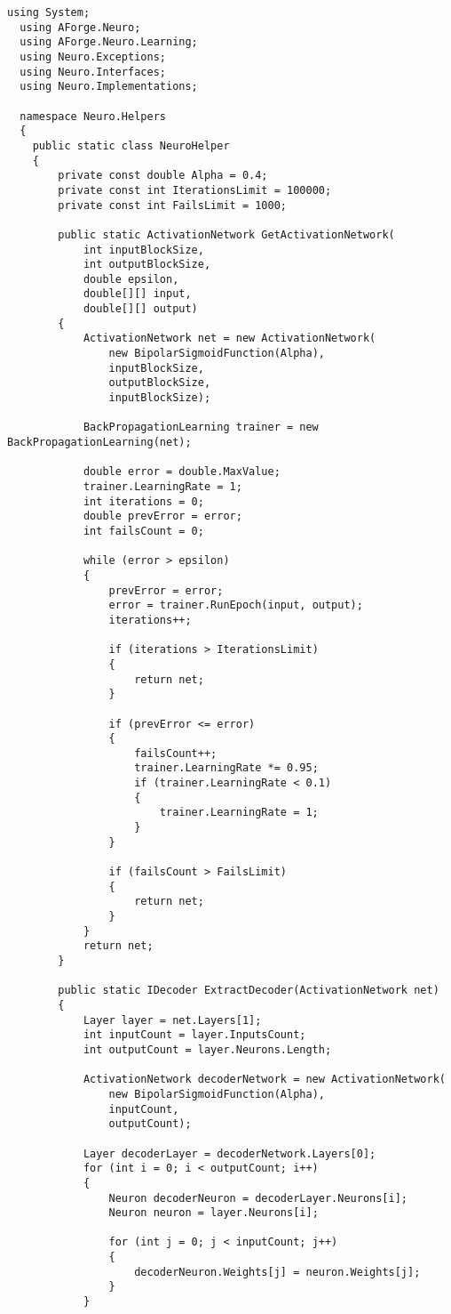 \begin{lstlisting}[style=csharpinlinestyle,caption={Обучение нейронной сети}, label=lst:appendix:neuro_learning]
  using System;
  using AForge.Neuro;
  using AForge.Neuro.Learning;
  using Neuro.Exceptions;
  using Neuro.Interfaces;
  using Neuro.Implementations;

  namespace Neuro.Helpers
  {
  	public static class NeuroHelper
  	{
  		private const double Alpha = 0.4;
  		private const int IterationsLimit = 100000;
  		private const int FailsLimit = 1000;

  		public static ActivationNetwork GetActivationNetwork(
  			int inputBlockSize,
  			int outputBlockSize,
  			double epsilon,
  			double[][] input,
  			double[][] output)
  		{
  			ActivationNetwork net = new ActivationNetwork(
  				new BipolarSigmoidFunction(Alpha),
  				inputBlockSize,
  				outputBlockSize,
  				inputBlockSize);

  			BackPropagationLearning trainer = new BackPropagationLearning(net);

  			double error = double.MaxValue;
  			trainer.LearningRate = 1;
  			int iterations = 0;
  			double prevError = error;
  			int failsCount = 0;

  			while (error > epsilon)
  			{
  				prevError = error;
  				error = trainer.RunEpoch(input, output);
  				iterations++;

  				if (iterations > IterationsLimit)
  				{
  					return net;
  				}

  				if (prevError <= error)
  				{
  					failsCount++;
  					trainer.LearningRate *= 0.95;
  					if (trainer.LearningRate < 0.1)
  					{
  						trainer.LearningRate = 1;
  					}
  				}

  				if (failsCount > FailsLimit)
  				{
  					return net;
  				}
  			}
  			return net;
  		}

  		public static IDecoder ExtractDecoder(ActivationNetwork net)
  		{
  			Layer layer = net.Layers[1];
  			int inputCount = layer.InputsCount;
  			int outputCount = layer.Neurons.Length;

  			ActivationNetwork decoderNetwork = new ActivationNetwork(
  				new BipolarSigmoidFunction(Alpha),
  				inputCount,
  				outputCount);

  			Layer decoderLayer = decoderNetwork.Layers[0];
  			for (int i = 0; i < outputCount; i++)
  			{
  				Neuron decoderNeuron = decoderLayer.Neurons[i];
  				Neuron neuron = layer.Neurons[i];

  				for (int j = 0; j < inputCount; j++)
  				{
  					decoderNeuron.Weights[j] = neuron.Weights[j];
  				}
  			}


\end{lstlisting}
